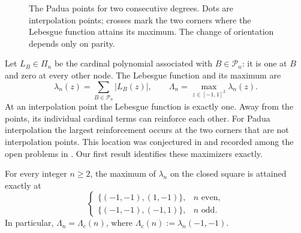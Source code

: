 \begin{figure}[t]
\centering
{}
\caption{The Padua points for two consecutive degrees. Dots are interpolation
points; crosses mark the two corners where the Lebesgue function attains
its maximum. The change of orientation depends only on parity.}
\label{fig:padua-nodes}
\end{figure}

Let $L_B\in\Pi_n$ be the cardinal polynomial associated with
$B\in\mathcal P_n$: it is one at $B$ and zero at every other node.
The Lebesgue function and its maximum are
\[
 \lambda_n(z)=\sum_{B\in\mathcal P_n}|L_B(z)|,
 \qquad \Lambda_n=\max_{z\in[-1,1]^2}\lambda_n(z).
\]
At an interpolation point the Lebesgue function is exactly one. Away from
the points, its individual cardinal terms can reinforce each other.
For Padua interpolation the largest reinforcement occurs at the two corners
that are not interpolation points. This location was conjectured in
\cite{CaliariDeMarchiSommarivaVianello2008poster} and recorded among the
open problems in \cite[Section~3.3]{DeMarchi2022}.
Our first result identifies these maximizers exactly.

\begin{theorem}\label{thm:main-location}
For every integer $n\geq2$, the maximum of $\lambda_n$ on the closed square
is attained exactly at
\[
 \begin{cases}
 \{(-1,-1),(1,-1)\},&n\text{ even},\\
 \{(-1,-1),(-1,1)\},&n\text{ odd}.
 \end{cases}
\]
In particular, $\Lambda_n=\Lambda_c(n)$, where
$\Lambda_c(n):=\lambda_n(-1,-1)$.
\end{theorem}

